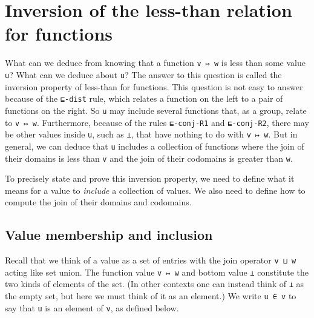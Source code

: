 \hypertarget{inversion-of-the-less-than-relation-for-functions}{%
\section{Inversion of the less-than relation for
functions}\label{inversion-of-the-less-than-relation-for-functions}}

What can we deduce from knowing that a function \texttt{v\ ↦\ w} is less
than some value \texttt{u}? What can we deduce about \texttt{u}? The
answer to this question is called the inversion property of less-than
for functions. This question is not easy to answer because of the
\texttt{⊑-dist} rule, which relates a function on the left to a pair of
functions on the right. So \texttt{u} may include several functions
that, as a group, relate to \texttt{v\ ↦\ w}. Furthermore, because of
the rules \texttt{⊑-conj-R1} and \texttt{⊑-conj-R2}, there may be other
values inside \texttt{u}, such as \texttt{⊥}, that have nothing to do
with \texttt{v\ ↦\ w}. But in general, we can deduce that \texttt{u}
includes a collection of functions where the join of their domains is
less than \texttt{v} and the join of their codomains is greater than
\texttt{w}.

To precisely state and prove this inversion property, we need to define
what it means for a value to \emph{include} a collection of values. We
also need to define how to compute the join of their domains and
codomains.

\hypertarget{value-membership-and-inclusion}{%
\subsection{Value membership and
inclusion}\label{value-membership-and-inclusion}}

Recall that we think of a value as a set of entries with the join
operator \texttt{v\ ⊔\ w} acting like set union. The function value
\texttt{v\ ↦\ w} and bottom value \texttt{⊥} constitute the two kinds of
elements of the set. (In other contexts one can instead think of
\texttt{⊥} as the empty set, but here we must think of it as an
element.) We write \texttt{u\ ∈\ v} to say that \texttt{u} is an element
of \texttt{v}, as defined below.

